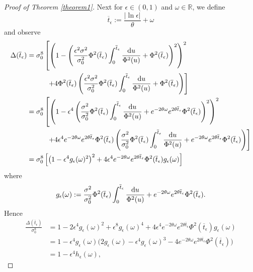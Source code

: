 \documentclass[12pt,thmsa]{article}
\begin{document}
\begin{proof}[Proof of Theorem \ref{theorem1}]
	Next for $\epsilon\in(0,1)$ and $\omega\in \mathbb{R}$, we define
	$$ \overline{t}_\epsilon:=\frac{|\ln \epsilon|}{\theta} +\omega$$ 
	and observe 
	\[
	\begin{split}
		\Delta(\overline{t}_\epsilon)&=\sigma_0^8\left[\left(1-\left(\frac{\epsilon^2\sigma^2}{\sigma_0^2}\Phi^2(\overline{t}_\epsilon)\int_0^{ \overline{t}_\epsilon}\frac{{\rm d}u}{\Phi^2(u)}+\Phi^2(\overline{t}_\epsilon)\right)^2\right)^2\right.\\
		&\hspace{1cm}\left. +4 \Phi^2(\overline{t}_\epsilon)\left(\frac{\epsilon^2\sigma^2}{\sigma_0^2}\Phi^2(\overline{t}_\epsilon)\int_0^{ \overline{t}_\epsilon}\frac{{\rm d}u}{\Phi^2(u)}+\Phi^2(\overline{t}_\epsilon)\right)\right]\\
		&=\sigma_0^8\left[\left(1-\epsilon^4\left(\frac{\sigma^2}{\sigma_0^2}\Phi^2(\overline{t}_\epsilon)\int_0^{ \overline{t}_\epsilon}\frac{{\rm d}u}{\Phi^2(u)}+e^{-2\theta \omega}e^{2\theta \overline{t}_\epsilon}\Phi^2(\overline{t}_\epsilon) \right)^2\right)^2\right.\\
		&\hspace{1cm}\left. +4  \epsilon^4e^{-2\theta \omega}e^{2\theta \overline{t}_\epsilon}\Phi^2(\overline{t}_\epsilon)\left(\frac{\sigma^2}{\sigma_0^2}\Phi^2(\overline{t}_\epsilon)\int_0^{ \overline{t}_\epsilon}\frac{{\rm d}u}{\Phi^2(u)}+e^{-2\theta \omega}e^{2\theta \overline{t}_\epsilon}\Phi^2(\overline{t}_\epsilon)\right)\right]\\
		&=\sigma_0^8\left[\left(1-\epsilon^4 g_\epsilon(\omega)^2\right)^2+4 \epsilon^4e^{-2\theta \omega}e^{2\theta \overline{t}_\epsilon}\Phi^2(\overline{t}_\epsilon)g_\epsilon(\omega)\right]
	\end{split}
	\]
	where 
	\[
	g_\epsilon(\omega):=\frac{\sigma^2}{\sigma_0^2}\Phi^2(\overline{t}_\epsilon)\int_0^{ \overline{t}_\epsilon}\frac{{\rm d}u}{\Phi^2(u)}+e^{-2\theta \omega}e^{2\theta \overline{t}_\epsilon}\Phi^2(\overline{t}_\epsilon).
	\]
	Hence
	\[
	\begin{split}
		\frac{\Delta(\overline{t}_\epsilon)}{\sigma_0^8}
		&=1-2\epsilon^4 g_\epsilon(\omega)^2+\epsilon^8 g_\epsilon(\omega)^4+4 \epsilon^4e^{-2\theta \omega}e^{2\theta \overline{t}_\epsilon}\Phi^2(\overline{t}_\epsilon)g_\epsilon(\omega)\\
		&=1-\epsilon^4 g_\epsilon(\omega)\Big(2g_\epsilon(\omega)-\epsilon^4 g_\epsilon(\omega)^3-4 e^{-2\theta \omega}e^{2\theta \overline{t}_\epsilon}\Phi^2(\overline{t}_\epsilon)\Big)\\
		&=1-\epsilon^4 h_\epsilon(\omega),

\end{split}\]
\end{proof}
\end{document}
